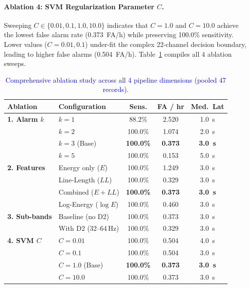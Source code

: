 \documentclass[10pt,twocolumn,letterpaper]{article}
\begin{document}
{\paragraph{Ablation 4: SVM Regularization Parameter $C$.}
Sweeping $C \in \{0.01, 0.1, 1.0, 10.0\}$ indicates that $C=1.0$ and $C=10.0$ achieve the lowest false alarm rate (0.373~FA/h) while preserving 100.0\% sensitivity. Lower values ($C=0.01, 0.1$) under-fit the complex 22-channel decision boundary, leading to higher false alarms (0.504~FA/h). Table~\ref{tab:ablation_all} compiles all 4 ablation sweeps.

\begin{table}[h]
\centering
\footnotesize
\setlength{\tabcolsep}{2.5pt}
\color{blue}
\caption{\textcolor{blue}{Comprehensive ablation study across all 4 pipeline dimensions (pooled 47 records).}}
\label{tab:ablation_all}
\begin{tabular}{llccc}
\toprule
\textbf{Ablation} & \textbf{Configuration} & \textbf{Sens.} & \textbf{FA / hr} & \textbf{Med.\ Lat} \\
\midrule
\textbf{1. Alarm $k$} & $k = 1$ & 88.2\% & 2.520 & 1.0~s \\
 & $k = 2$ & 100.0\% & 1.074 & 2.0~s \\
 & $k = 3$ (Base) & \textbf{100.0\%} & \textbf{0.373} & \textbf{3.0~s} \\
 & $k = 5$ & 100.0\% & 0.153 & 5.0~s \\
\midrule
\textbf{2. Features} & Energy only ($E$) & 100.0\% & 1.249 & 3.0~s \\
 & Line-Length ($LL$) & 100.0\% & 0.329 & 3.0~s \\
 & Combined ($E+LL$) & \textbf{100.0\%} & \textbf{0.373} & \textbf{3.0~s} \\
 & Log-Energy ($\log E$) & 100.0\% & 0.460 & 3.0~s \\
\midrule
\textbf{3. Sub-bands} & Baseline (no D2) & 100.0\% & 0.373 & 3.0~s \\
 & With D2 (32--64\,Hz) & 100.0\% & 0.329 & 3.0~s \\
\midrule
\textbf{4. SVM $C$} & $C = 0.01$ & 100.0\% & 0.504 & 4.0~s \\
 & $C = 0.1$ & 100.0\% & 0.504 & 3.0~s \\
 & $C = 1.0$ (Base) & \textbf{100.0\%} & \textbf{0.373} & \textbf{3.0~s} \\
 & $C = 10.0$ & 100.0\% & 0.373 & 3.0~s \\
\bottomrule
\end{tabular}
\end{table}

}
\end{document}
